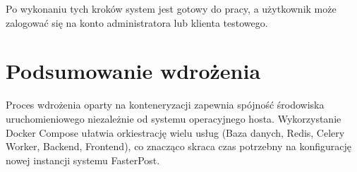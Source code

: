Po wykonaniu tych kroków system jest gotowy do pracy, a użytkownik może zalogować się na konto administratora lub klienta testowego.

\section{Podsumowanie wdrożenia}

Proces wdrożenia oparty na konteneryzacji zapewnia spójność środowiska uruchomieniowego niezależnie od systemu operacyjnego hosta. Wykorzystanie Docker Compose ułatwia orkiestrację wielu usług (Baza danych, Redis, Celery Worker, Backend, Frontend), co znacząco skraca czas potrzebny na konfigurację nowej instancji systemu FasterPost.